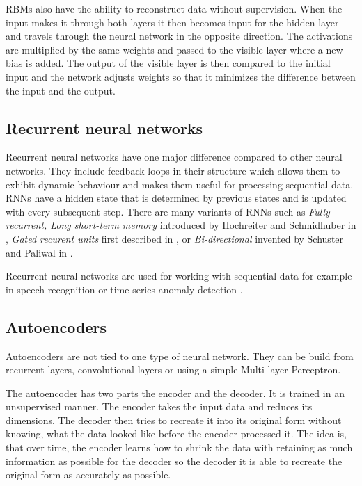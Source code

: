 RBMs also have the ability to reconstruct data without supervision. When the input makes it through both layers it then becomes input for the hidden layer and travels through the neural network in the opposite direction. The activations are multiplied by the same weights and passed to the visible layer where a new bias is added. The output of the visible layer is then compared to the initial input and the network adjusts weights so that it minimizes the difference between the input and the output.

\subsection{Recurrent neural networks}
Recurrent neural networks have one major difference compared to other neural networks. They include feedback loops in their structure which allows them to exhibit dynamic behaviour and makes them useful for processing sequential data. RNNs have a hidden state that is determined by previous states and is updated with every subsequent step. There are many variants of RNNs such as \textit{Fully recurrent, Long short-term memory} introduced by Hochreiter and Schmidhuber in \cite{doi:10.1162/neco.1997.9.8.1735}, \textit{Gated recurent units} first described in \cite{cho-etal-2014-learning}, or \textit{Bi-directional} invented by Schuster and Paliwal in \cite{Schuster1997BidirectionalRN}. 

Recurrent neural networks are used for working with sequential data for example in speech recognition \cite{DBLP:journals/corr/abs-1303-5778} or time-series anomaly detection \cite{inproceedings_RNN_anomaly_detection}.


\subsection{Autoencoders}
Autoencoders are not tied to one type of neural network. They can be build from recurrent layers, convolutional layers or using a simple Multi-layer Perceptron.

The autoencoder has two parts the encoder and the decoder. It is trained in an unsupervised manner. The encoder takes the input data and reduces its dimensions. The decoder then tries to recreate it into its original form without knowing, what the data looked like before the encoder processed it. The idea is, that over time, the encoder learns how to shrink the data with retaining as much information as possible for the decoder so the decoder it is able to recreate the original form as accurately as possible. 

